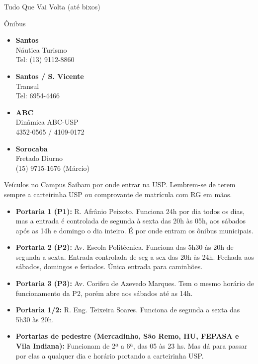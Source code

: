 \begin{secao}{Tudo Que Vai Volta (até bixos)}
\begin{subsecao}{Ônibus}
\begin{itemize}
  \item {\bf Santos}\\
    Náutica Turismo\\
    Tel: (13) 9112-8860

  \item {\bf Santos / S. Vicente}\\
    Transul\\
    Tel: 6954-4466

  \item {\bf ABC}\\
    Dinâmica ABC-USP\\
    4352-0565 / 4109-0172

  \item {\bf Sorocaba}\\
    Fretado Diurno\\
    (15) 9715-1676 (Márcio)

\end{itemize}

\end{subsecao}


\begin{subsecao}{Veículos no Campus}
Saibam por onde entrar na USP. Lembrem-se de terem sempre a carteirinha USP ou
comprovante de matrícula com RG em mãos.
\begin{itemize}
  \item {\bf Portaria 1 (P1):} R. Afrânio Peixoto. Funciona 24h por dia todos os
    dias, mas a entrada é controlada de segunda à sexta das 20h às 05h, aos sábados
    após as 14h e domingo o dia inteiro. É por onde entram os ônibus municipais.

  \item {\bf Portaria 2 (P2):} Av. Escola Politécnica. Funciona das 5h30 às 20h
    de segunda a sexta. Entrada controlada de seg a sex das 20h às 24h. Fechada
    aos sábados, domingos e feriados. Única entrada para caminhões.

  \item {\bf Portaria 3 (P3):} Av. Corifeu de Azevedo Marques. Tem o mesmo horário
    de funcionamento da P2, porém abre aos sábados até as 14h.

  \item {\bf Portaria 1/2:} R. Eng. Teixeira Soares. Funciona de segunda a sexta das 5h30 às 20h.

  \item {\bf Portarias de pedestre (Mercadinho, São Remo, HU, FEPASA e
      Vila Indiana):} Funcionam de 2ª a 6ª, das 05 às 23 hs. Mas dá para passar
      por elas a qualquer dia e horário portando a carteirinha USP.


\end{itemize}
\end{subsecao}
\end{secao}
